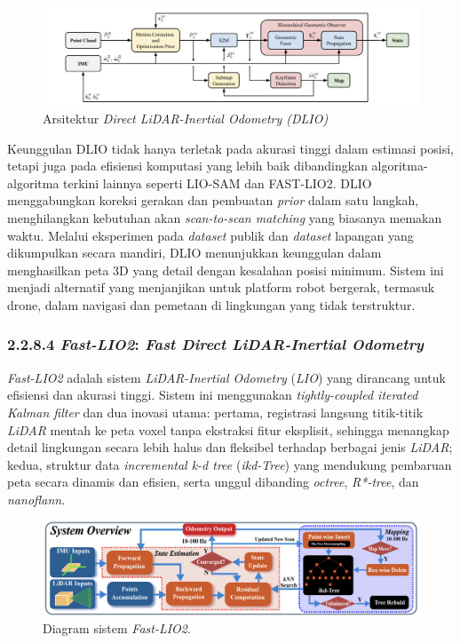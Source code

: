 \begin{figure} [H] \centering
  \includegraphics[scale=0.6]{gambar/bab2/dlio_Arch.png}
  \caption{Arsitektur \emph{Direct LiDAR-Inertial Odometry (DLIO)} \cite{chen2022dlio}}
  \label{fig:DLIO Architecture}
\end{figure}

Keunggulan DLIO tidak hanya terletak pada akurasi tinggi dalam estimasi posisi, tetapi juga pada efisiensi komputasi yang lebih baik dibandingkan algoritma-algoritma terkini lainnya seperti LIO-SAM dan FAST-LIO2. DLIO menggabungkan koreksi gerakan dan pembuatan \emph{prior} dalam satu langkah, menghilangkan kebutuhan akan \emph{scan-to-scan matching} yang biasanya memakan waktu. Melalui eksperimen pada \emph{dataset} publik dan \emph{dataset} lapangan yang dikumpulkan secara mandiri, DLIO menunjukkan keunggulan dalam menghasilkan peta 3D yang detail dengan kesalahan posisi minimum. Sistem ini menjadi alternatif yang menjanjikan untuk platform robot bergerak, termasuk drone, dalam navigasi dan pemetaan di lingkungan yang tidak terstruktur.



\subsubsection{2.2.8.4 \emph{Fast-LIO2}: \emph{Fast Direct LiDAR-Inertial Odometry}}

\emph{Fast-LIO2} adalah sistem \emph{LiDAR-Inertial Odometry} (\emph{LIO}) yang dirancang untuk efisiensi dan akurasi tinggi. Sistem ini menggunakan \emph{tightly-coupled iterated Kalman filter} dan dua inovasi utama: pertama, registrasi langsung titik-titik \emph{LiDAR} mentah ke peta voxel tanpa ekstraksi fitur eksplisit, sehingga menangkap detail lingkungan secara lebih halus dan fleksibel terhadap berbagai jenis \emph{LiDAR}; kedua, struktur data \emph{incremental k-d tree} (\emph{ikd-Tree}) yang mendukung pembaruan peta secara dinamis dan efisien, serta unggul dibanding \emph{octree}, \emph{R*-tree}, dan \emph{nanoflann}.

\begin{figure}[H]
    \centering
    \includegraphics[width=1\textwidth]{gambar/bab2/fast-lio2.png}
    \caption{Diagram sistem \emph{Fast-LIO2}. \cite{xu2022fastlio}}
    \label{fig:fastlio2}
\end{figure}

